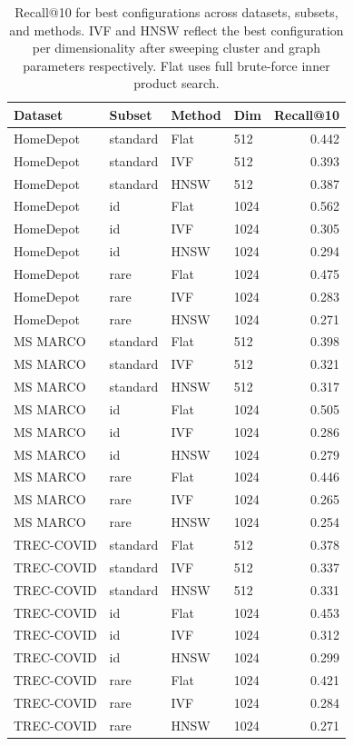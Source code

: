 \documentclass[manuscript]{acmart}
\begin{document}
\begin{table}[ht]
\centering
\small
\begin{tabular}{llllr}
\toprule
Dataset & Subset & Method & Dim & Recall@10 \\
\midrule
HomeDepot & standard & Flat & 512 & 0.442 \\
HomeDepot & standard & IVF & 512 & 0.393 \\
HomeDepot & standard & HNSW & 512 & 0.387 \\
HomeDepot & id & Flat & 1024 & 0.562 \\
HomeDepot & id & IVF & 1024 & 0.305 \\
HomeDepot & id & HNSW & 1024 & 0.294 \\
HomeDepot & rare & Flat & 1024 & 0.475 \\
HomeDepot & rare & IVF & 1024 & 0.283 \\
HomeDepot & rare & HNSW & 1024 & 0.271 \\
MS MARCO & standard & Flat & 512 & 0.398 \\
MS MARCO & standard & IVF & 512 & 0.321 \\
MS MARCO & standard & HNSW & 512 & 0.317 \\
MS MARCO & id & Flat & 1024 & 0.505 \\
MS MARCO & id & IVF & 1024 & 0.286 \\
MS MARCO & id & HNSW & 1024 & 0.279 \\
MS MARCO & rare & Flat & 1024 & 0.446 \\
MS MARCO & rare & IVF & 1024 & 0.265 \\
MS MARCO & rare & HNSW & 1024 & 0.254 \\
TREC-COVID & standard & Flat & 512 & 0.378 \\
TREC-COVID & standard & IVF & 512 & 0.337 \\
TREC-COVID & standard & HNSW & 512 & 0.331 \\
TREC-COVID & id & Flat & 1024 & 0.453 \\
TREC-COVID & id & IVF & 1024 & 0.312 \\
TREC-COVID & id & HNSW & 1024 & 0.299 \\
TREC-COVID & rare & Flat & 1024 & 0.421 \\
TREC-COVID & rare & IVF & 1024 & 0.284 \\
TREC-COVID & rare & HNSW & 1024 & 0.271 \\
\bottomrule
\end{tabular}
\caption{Recall@10 for best configurations across datasets, subsets, and methods. IVF and HNSW reflect the best configuration per dimensionality after sweeping cluster and graph parameters respectively. Flat uses full brute-force inner product search.}
\label{tab:detailed-results}
\end{table}
\end{document}
